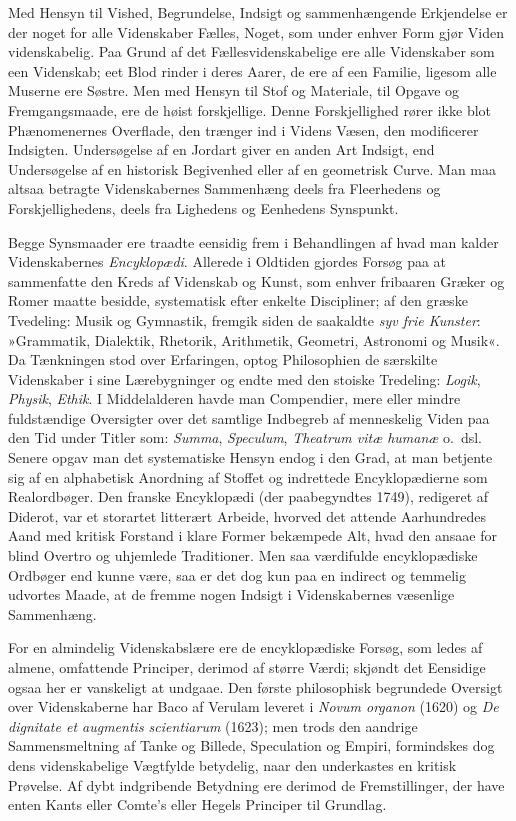 \documentclass[12pt]{book}
\newcommand{\apage}[1]{\marginnote{\footnotesize\textit{[#1]}}}
\begin{document}
\noindent Med Hensyn til Vished, Begrundelse, Indsigt og sammenhængende
Erkjendelse er der noget for alle Videnskaber Fælles, Noget, som under
enhver Form gjør Viden videnskabelig. Paa Grund af det Fællesvidenskabelige
ere alle Videnskaber som een Videnskab; eet Blod rinder i deres Aarer, de
ere af een Familie, ligesom alle Muserne ere Søstre. Men med Hensyn til
Stof og Materiale, til Opgave og Fremgangsmaade, ere de høist forskjellige.
Denne Forskjellighed rører ikke blot Phænomenernes Overflade, den trænger
ind i Videns Væsen, den modificerer Indsigten. Undersøgelse af en Jordart
giver en anden Art Indsigt, end Undersøgelse af en historisk Begivenhed
eller af en geometrisk Curve. Man maa altsaa betragte Videnskabernes
Sammenhæng deels fra Fleerhedens og Forskjellighedens, deels fra Lighedens
og Eenhedens Synspunkt.

Begge Synsmaader ere traadte eensidig frem i Behandlingen af hvad man
kalder Videnskabernes \emph{Encyklopædi}. Allerede i Oldtiden gjordes Forsøg paa
at sammenfatte den Kreds af Videnskab og Kunst, som enhver fribaaren Græker
og Romer maatte besidde, systematisk efter enkelte Discipliner; af den
græske Tvedeling: Musik og Gymnastik, fremgik siden de saakaldte \emph{syv frie
Kunster}: »Grammatik, Dialektik, Rhetorik, Arithmetik, Geometri, Astronomi
og Musik«. \apage{81} Da Tænkningen stod over Erfaringen, optog Philosophien de
særskilte Videnskaber i sine Lærebygninger og endte med den stoiske
Tredeling: \emph{Logik}, \emph{Physik}, \emph{Ethik}. I Middelalderen havde man Compendier,
mere eller mindre fuldstændige Oversigter over det samtlige Indbegreb af
menneskelig Viden paa den Tid under Titler som: \emph{Summa}, \emph{Speculum},
\emph{Theatrum vitæ humanæ} o.\ dsl. Senere opgav man det systematiske Hensyn
endog i den Grad, at man betjente sig af en alphabetisk Anordning af
Stoffet og indrettede Encyklopædierne som Realordbøger. Den franske
Encyklopædi (der paabegyndtes 1749), redigeret af Diderot, var et
storartet litterært Arbeide, hvorved det attende Aarhundredes Aand med
kritisk Forstand i klare Former bekæmpede Alt, hvad den ansaae for blind
Overtro og uhjemlede Traditioner. Men saa værdifulde encyklopædiske
Ordbøger end kunne være, saa er det dog kun paa en indirect og temmelig
udvortes Maade, at de fremme nogen Indsigt i Videnskabernes væsenlige
Sammenhæng.

For en almindelig Videnskabslære ere de encyklopædiske Forsøg, som ledes
af almene, omfattende Principer, derimod af større Værdi; skjøndt det
Eensidige ogsaa her er vanskeligt at undgaae. Den første philosophisk
begrundede Oversigt over Videnskaberne har Baco af Verulam leveret i
\emph{Novum organon} (1620) og \emph{De dignitate et augmentis
scientiarum} (1623); men trods den aandrige Sammensmeltning af Tanke og
Billede, Speculation og Empiri, formindskes dog dens videnskabelige
Vægtfylde betydelig, naar den \apage{82} underkastes en kritisk Prøvelse. Af dybt
indgribende Betydning ere derimod de Fremstillinger, der have enten Kants
eller Comte's eller Hegels Principer til Grundlag.
\end{document}
